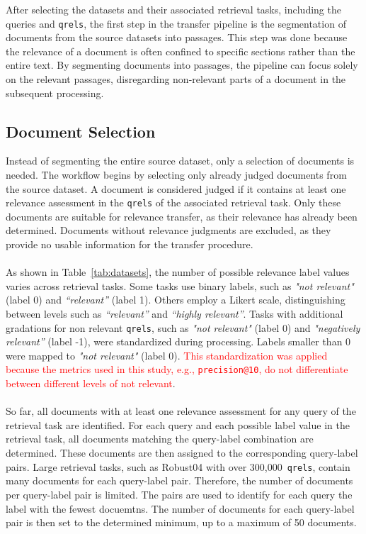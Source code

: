 After selecting the datasets and their associated retrieval tasks, including the queries and \texttt{qrels}, the first step in the transfer pipeline is the segmentation of documents from the source datasets into passages. This step was done because the relevance of a document is often confined to specific sections rather than the entire text. By segmenting documents into passages, the pipeline can focus solely on the relevant passages, disregarding non-relevant parts of a document in the subsequent processing.

\subsection{Document Selection}\label{document-selection}

Instead of segmenting the entire source dataset, only a selection of documents is needed. The workflow begins by selecting only already judged documents from the source dataset. A document is considered judged if it contains at least one relevance assessment in the \texttt{qrels} of the associated retrieval task. Only these documents are suitable for relevance transfer, as their relevance has already been determined. Documents without relevance judgments are excluded, as they provide no usable information for the transfer procedure.
\\\\
As shown in Table~\ref{tab:datasets}, the number of possible relevance label values varies across retrieval tasks. Some tasks use binary labels, such as \textit{"not relevant"} (label 0) and \textit{“relevant”} (label 1). Others employ a Likert scale, distinguishing between levels such as \textit{“relevant”} and \textit{“highly relevant”}. Tasks with additional gradations for non relevant \texttt{qrels}, such as \textit{"not relevant"} (label 0) and \textit{"negatively relevant”} (label -1), were standardized during processing. Labels smaller than 0 were mapped to \textit{"not relevant"} (label 0). \textcolor{red}{This standardization was applied because the metrics used in this study, e.g., \texttt{precision@10}, do not differentiate between different levels of not relevant}.
\\\\
So far, all documents with at least one relevance assessment for any query of the retrieval task are identified. For each query and each possible label value in the retrieval task, all documents matching the query-label combination are determined. These documents are then assigned to the corresponding query-label pairs. Large retrieval tasks, such as Robust04 with over 300,000~\texttt{qrels}, contain many documents for each query-label pair. Therefore, the number of documents per query-label pair is limited. The pairs are used to identify for each query the label with the fewest docuemtns. The number of documents for each query-label pair is then set to the determined minimum, up to a maximum of 50 documents. 
